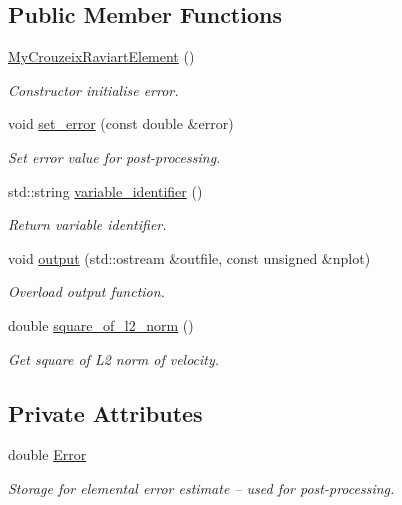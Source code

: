 \subsection*{Public Member Functions}
\begin{DoxyCompactItemize}
\item 
\hyperlink{classoomph_1_1MyCrouzeixRaviartElement_a6719573c11157d360cb0a0fd0d2b92f4}{My\+Crouzeix\+Raviart\+Element} ()
\begin{DoxyCompactList}\small\item\em Constructor initialise error. \end{DoxyCompactList}\item 
void \hyperlink{classoomph_1_1MyCrouzeixRaviartElement_a0b1ccbfb0eda6807c3a332aa0b6ea6e2}{set\+\_\+error} (const double \&error)
\begin{DoxyCompactList}\small\item\em Set error value for post-\/processing. \end{DoxyCompactList}\item 
std\+::string \hyperlink{classoomph_1_1MyCrouzeixRaviartElement_afbec727a48f104b945cc54f798cbd1d3}{variable\+\_\+identifier} ()
\begin{DoxyCompactList}\small\item\em Return variable identifier. \end{DoxyCompactList}\item 
void \hyperlink{classoomph_1_1MyCrouzeixRaviartElement_ad1ea7115e6cb090d687ac421e56f4d16}{output} (std\+::ostream \&outfile, const unsigned \&nplot)
\begin{DoxyCompactList}\small\item\em Overload output function. \end{DoxyCompactList}\item 
double \hyperlink{classoomph_1_1MyCrouzeixRaviartElement_a18e8ab7199f42ca292214180ed86aa3a}{square\+\_\+of\+\_\+l2\+\_\+norm} ()
\begin{DoxyCompactList}\small\item\em Get square of L2 norm of velocity. \end{DoxyCompactList}\end{DoxyCompactItemize}
\subsection*{Private Attributes}
\begin{DoxyCompactItemize}
\item 
double \hyperlink{classoomph_1_1MyCrouzeixRaviartElement_aac525f961951f5d621f141b4fcdda357}{Error}
\begin{DoxyCompactList}\small\item\em Storage for elemental error estimate -- used for post-\/processing. \end{DoxyCompactList}\end{DoxyCompactItemize}


